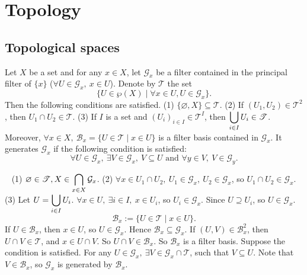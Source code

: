 \chapter{Topology}
\section{Topological spaces}
\begin{propositionenv}
    Let $X$ be a set and for any $x\in X$, let $\mathcal{G}_x$ be a filter contained in the principal filter of $\{x\}$ ($\forall U\in \mathcal{G}_x,\ x\in U$). Denote by $\mathscr{T}$ the set 
    $$\{U\in \wp(X) \mid \forall x\in U, U\in\mathcal{G}_x\}.$$
    Then the following conditions are satisfied.
    \newline
    (1) $\{\varnothing, X\} \subseteq \mathscr{T}$.
    \newline
    (2) If $(U_1,U_2)\in \mathscr{T}^2$, then $U_1\cap U_2\in \mathscr{T}$.
    \newline
    (3) If $I$ is a set and $\left(U_i\right)_{i\in I}\in \mathscr{T}^I$, then $\displaystyle \bigcup_{i\in I}U_i\in \mathscr{T}$.
    \newline
    Moreover, $\forall x\in X,\ \mathcal{B}_x=\{U\in \mathscr{T}\mid x\in U\}$ is a filter basis contained in $\mathcal{G}_x$. It generates $\mathcal{G}_x$ if the following condition is satisfied:
    $$\forall U\in \mathcal{G}_x,\ \exists V\in \mathcal{G}_x,\ V\subseteq U \text{ and } \forall y\in V,\ V\in \mathcal{G}_y.$$
\end{propositionenv}
\begin{proofenv}
    \ \newline
    (1) $\displaystyle \varnothing \in \mathscr{T}, X\in \bigcap_{x\in X}\mathcal{G}_x$.
    \newline
    (2) $\forall x\in U_1\cap U_2,\ U_1\in \mathcal{G}_x,\ U_2\in \mathcal{G}_x$, so $U_1\cap U_2\in \mathcal{G}_x$.
    \newline
    (3) Let $\displaystyle U=\bigcup_{i\in I}U_i$. $\forall x\in U,\ \exists i\in I,\ x\in U_i$, so $U_i\in \mathcal{G}_x$. Since $U\supseteq U_i$, so $U\in\mathcal{G}_x$.
    $$\mathcal{B}_x:=\{U\in \mathscr{T}\mid x\in U\}.$$
    If $U\in \mathcal{B}_x$, then $x\in U$, so $U\in \mathcal{G}_x$. Hence $\mathcal{B}_x\subseteq\mathcal{G}_x$. If $(U,V)\in \mathcal{B}_x^2$, then $U\cap V\in \mathscr{T}$, and $x\in U\cap V$. So $U\cap V\in \mathcal{B}_x$. So $\mathcal{B}_x$ is a filter basis. Suppose the condition is satisfied. For any $U\in \mathcal{G}_x,\ \exists V\in \mathcal{G}_x\cap\mathscr{T}$, such that $V\subseteq U$. Note that $V\in \mathcal{B}_x$, so $\mathcal{G}_x$ is generated by $\mathcal{B}_x$.
\end{proofenv}

